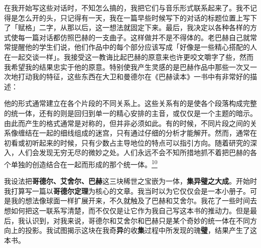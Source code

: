 \documentclass[
  12pt,
  twoside,
  openright,
  oldfontcommands,
]{memoir}
\newcommand{\heititext}[1]{{\heifamily\bfseries #1}}
\newenvironment{fsquote}{%
  \begin{mdframed}[style=gebquote]\kaitifamily\small%
}{%
  \end{mdframed}%
}
\begin{document}
在我开始写这些对话时，不知怎么搞的，我把它们与音乐形式联系起来了。我不记得是怎么开的头，只记得有一天，我在一篇早些时候写下的对话的标题位置上写下了「赋格」二字，从那以后，这一想法就固定下来。最后，我决定以各种各样的方式使每一篇对话都仿照巴赫的一支曲子。这样做并不是不得体的。老巴赫自己就常常提醒他的学生们说，他们作品中的每个部分应该写成「好像是一些精心搭配的人在一起交谈一样」。我接受这一教诲比起巴赫的原意来也许更咬文嚼字了些，然而我希望我的结果忠实于他的原意。特别使我产生灵感的是巴赫作品中那些一次又一次地打动我的特征，这些东西在大卫和曼德尔在《巴赫读本》一书中有非常好的描述：

\begin{fsquote}
他的形式通常建立在各个片段的不同关系上。这些关系有的是使各个段落构成完整的统一体，还有的则是回归到单一的精心安排的主音，或仅仅是一个主题的暗示。由此而产生的格式通常是对称的，但并非必须如此。有的时候，不同片段之间的关系像缠结在一起的细线组成的迷宫，只有通过仔细的分析才能解开。然而，通常在初看或初听起来的时候，只有少数占主导地位的特点可以指引方向。随着研究的深入，人们会发现无穷无尽的微妙之处。人们永远不会不知所措地抓不着把巴赫的各个单独的创造结合在一起而形成的那个统一体。\hyperref[fn:Introduction-10]{\textsuperscript{10}}
\end{fsquote}

我设法把\heititext{哥德尔、艾舍尔、巴赫}这三块稀世之宝嵌为一体，\heititext{集异璧之大成}。开始时我打算写一篇以\heititext{哥德尔定理}为核心的文章。我当时以为它仅仅会是一本小册子。可是我的想法像球面一样扩展开来，不久就触及了巴赫和艾舍尔。我花了一些时间去想如何把这一联系写清楚，而不仅仅是让它作为我自己写这本书的推动力。但是最后，我认识到，对我来说，哥德尔和艾舍尔和巴赫只是某个奇妙的统一体在不同方向上的投影。我试图揭示这块在我奇\heititext{异}的收\heititext{集}过程中所发现的瑰\heititext{璧}，结果产生了这本书。
\end{document}
